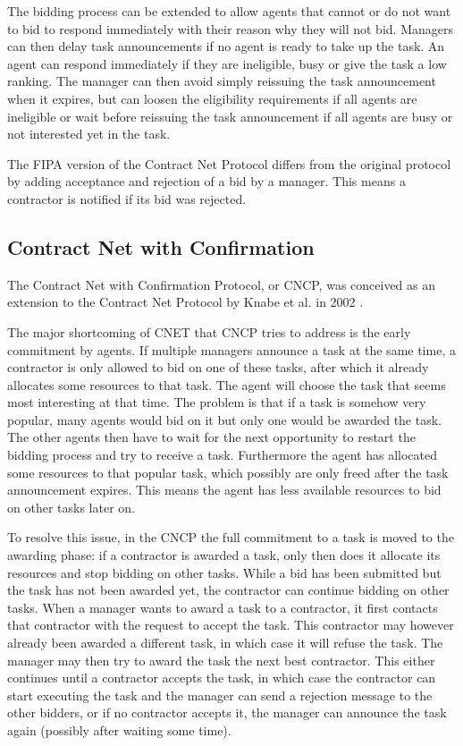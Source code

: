\documentclass[10pt,a4paper,twocolumn]{article}
\begin{document}
The bidding process can be extended to allow agents that cannot or do not want to bid to respond immediately with their reason why they will not bid. Managers can then delay task announcements if no agent is ready to take up the task. An agent can respond immediately if they are ineligible, busy or give the task a low ranking. The manager can then avoid simply reissuing the task announcement when it expires, but can loosen the eligibility requirements if all agents are ineligible or wait before reissuing the task announcement if all agents are busy or not interested yet in the task.

The FIPA version of the Contract Net Protocol \cite{CNETStandard} differs from the original protocol by adding acceptance and rejection of a bid by a manager. This means a contractor is notified if its bid was rejected.

\subsection{Contract Net with Confirmation} 
The Contract Net with Confirmation Protocol, or CNCP, was conceived as an extension to the Contract Net Protocol by Knabe et al. in 2002 \cite{CNCP}.

The major shortcoming of CNET that CNCP tries to address is the early commitment by agents. If multiple managers announce a task at the same time, a contractor is only allowed to bid on one of these tasks, after which it already allocates some resources to that task. The agent will choose the task that seems most interesting at that time. The problem is that if a task is somehow very popular, many agents would bid on it but only one would be awarded the task. The other agents then have to wait for the next opportunity to restart the bidding process and try to receive a task. Furthermore the agent has allocated some resources to that popular task, which possibly are only freed after the task announcement expires. This means the agent has less available resources to bid on other tasks later on.

To resolve this issue, in the CNCP the full commitment to a task is moved to the awarding phase: if a contractor is awarded a task, only then does it allocate its resources and stop bidding on other tasks. While a bid has been submitted but the task has not been awarded yet, the contractor can continue bidding on other tasks. When a manager wants to award a task to a contractor, it first contacts that contractor with the request to accept the task. This contractor may however already been awarded a different task, in which case it will refuse the task. The manager may then try to award the task the next best contractor. This either continues until a contractor accepts the task, in which case the contractor can start executing the task and the manager can send a rejection message to the other bidders, or if no contractor accepts it, the manager can announce the task again (possibly after waiting some time).
\end{document}
